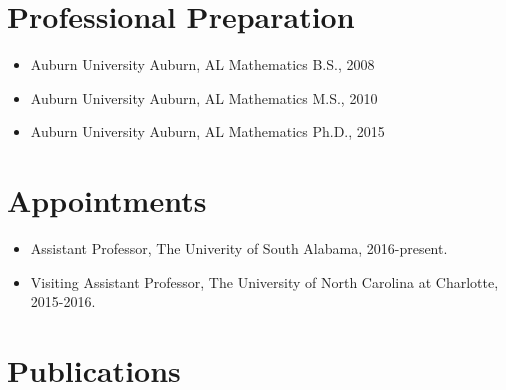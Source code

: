 
\setcounter{section}{0}


\section{Professional Preparation}

\begin{itemize}{}
  \item Auburn University \hspace{3em} Auburn, AL \hspace{3em} Mathematics \hspace{3em} B.S., 2008
  \item Auburn University \hspace{3em} Auburn, AL \hspace{3em} Mathematics \hspace{3em} M.S., 2010
  \item Auburn University \hspace{3em} Auburn, AL \hspace{3em} Mathematics \hspace{3em} Ph.D., 2015
\end{itemize}



\section{Appointments}

\begin{itemize}
  \item Assistant Professor, The Univerity of South Alabama, 2016-present.
  \item Visiting Assistant Professor, The University of North Carolina at
        Charlotte, 2015-2016.
\end{itemize}


\section{Publications}

